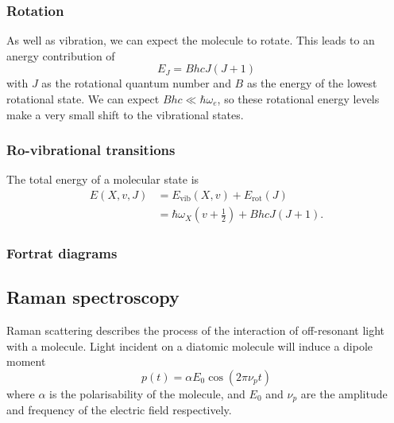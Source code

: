 
\subsubsection{Rotation}

As well as vibration, we can expect the molecule to rotate. This leads to an
anergy contribution of 
%
\begin{equation}
  E_J = BhcJ(J+1)
\end{equation}
%
with $J$ as the rotational quantum number and $B$ as the energy of the lowest
rotational state. We can expect $Bhc \ll \hbar\omega_e $, so these rotational
energy levels make a very small shift to the vibrational states.

\subsubsection{Ro-vibrational transitions}

The total energy of a molecular state is
%
\begin{align}
  E(X, v, J) &= E_\text{vib}(X, v) + E_\text{rot}(J) \\
  &= \hbar\omega_X\left(v + \frac{1}{2}\right) + BhcJ(J+1).
\end{align}
%

\subsubsection{Fortrat diagrams}


\subsection{Raman spectroscopy}

Raman scattering describes the process of the interaction of off-resonant light
with a molecule.  Light incident on a diatomic molecule will induce a dipole
moment
%
\begin{equation}
  p(t) = \alpha E_0 \cos(2\pi\nu_p t)
\end{equation}
%
where $\alpha$ is the polarisability of the molecule, and $E_0$ and $\nu_p$ are
the amplitude and frequency of the electric field respectively.


